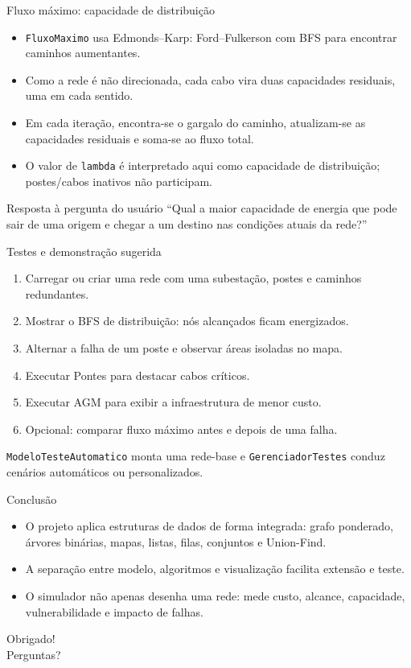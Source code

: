 \documentclass[aspectratio=169,10pt]{beamer}
\begin{document}
\begin{frame}{Fluxo máximo: capacidade de distribuição}
\begin{itemize}
  \item \texttt{FluxoMaximo} usa Edmonds--Karp: Ford--Fulkerson com BFS para encontrar caminhos aumentantes.
  \item Como a rede é não direcionada, cada cabo vira duas capacidades residuais, uma em cada sentido.
  \item Em cada iteração, encontra-se o gargalo do caminho, atualizam-se as capacidades residuais e soma-se ao fluxo total.
  \item O valor de \texttt{lambda} é interpretado aqui como capacidade de distribuição; postes/cabos inativos não participam.
\end{itemize}
\begin{block}{Resposta à pergunta do usuário}
  ``Qual a maior capacidade de energia que pode sair de uma origem e chegar a um destino nas condições atuais da rede?''
\end{block}
\end{frame}

\begin{frame}{Testes e demonstração sugerida}
\begin{enumerate}
  \item Carregar ou criar uma rede com uma subestação, postes e caminhos redundantes.
  \item Mostrar o BFS de distribuição: nós alcançados ficam energizados.
  \item Alternar a falha de um poste e observar áreas isoladas no mapa.
  \item Executar Pontes para destacar cabos críticos.
  \item Executar AGM para exibir a infraestrutura de menor custo.
  \item Opcional: comparar fluxo máximo antes e depois de uma falha.
\end{enumerate}
\vspace{0.2cm}
\small \texttt{ModeloTesteAutomatico} monta uma rede-base e \texttt{GerenciadorTestes} conduz cenários automáticos ou personalizados.
\end{frame}

\begin{frame}{Conclusão}
\begin{itemize}
  \item O projeto aplica estruturas de dados de forma integrada: grafo ponderado, árvores binárias, mapas, listas, filas, conjuntos e Union-Find.
  \item A separação entre modelo, algoritmos e visualização facilita extensão e teste.
  \item O simulador não apenas desenha uma rede: mede custo, alcance, capacidade, vulnerabilidade e impacto de falhas.
\end{itemize}
\vfill
\begin{center}
  \Large Obrigado!\\[0.2cm]
  \normalsize Perguntas?
\end{center}
\end{frame}
\end{document}
